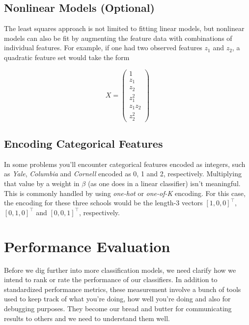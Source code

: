 \documentclass[a4paper]{article}
\begin{document}

\subsection{Nonlinear Models (Optional)}
The least squares approach is not limited to fitting linear models, but nonlinear models can also be fit by augmenting the feature data with combinations of individual features.  For example, if one had two observed features $z_1$ and $z_2$, a quadratic feature set would take the form

$$ X = \begin{pmatrix} 1 \\ z_1 \\ z_2 \\ z_1^2 \\ z_1 z_2 \\ z_2^2 \end{pmatrix} $$

\subsection{Encoding Categorical Features}
In some problems you'll encounter categorical features encoded as integers, such as \emph{Yale}, \emph{Columbia} and \emph{Cornell} encoded as 0, 1 and 2, respectively.  Multiplying that value by a weight in $\beta$ (as one does in a linear classifier) isn't meaningful.  This is commonly handled by using \emph{one-hot} or \emph{one-of-K} encoding.  For this case, the encoding for these three schools would be the length-3 vectors $[1,0,0]^\top$, $[0,1,0]^\top$ and $[0,0,1]^\top$, respectively.

\section{Performance Evaluation}

Before we dig further into more classification models, we need clarify how we intend to rank or rate the performance of our classifiers. In addition to standardized performance metrics, these measurement involve a bunch of tools used to keep track of what you're doing, how well you're doing and also for debugging purposes. They become our bread and butter for communicating results to others and we need to understand them well.
\end{document}
